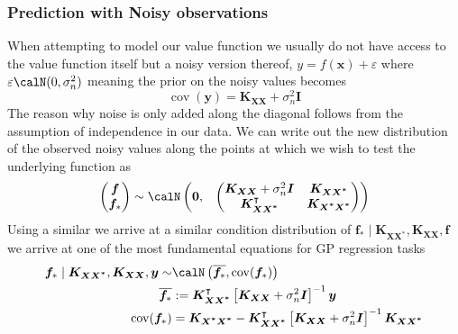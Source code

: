 \subsubsection{Prediction with Noisy observations}\label{Section1.1.2}
When attempting to model our value function we usually do not have access to the value function itself but a noisy version thereof, $y = f(\bm{x}) + \varepsilon$ where $\varepsilon \calN (0, \sigma_n^2)$ meaning the prior on the noisy values becomes
\[
	\operatorname{cov} (\bm{y}) = \bm{K_{XX}} + \sigma_n^2 \bm{I}
\]
The reason why noise is only added along the diagonal follows from the assumption of independence in our data.
We can write out the new distribution of the observed noisy values along the points at which we wish to test the underlying function as
\[
	\begin{pmatrix}
		\bm{f} \\
		\bm{f}_{\ast}
	\end{pmatrix}
	\sim \calN
	\begin{pmatrix}
		\bm{0}, &
		{
				\begin{pmatrix}
					\bm{K_{XX}} + \sigma_n^2 \bm{I} & \bm{K_{XX^{\ast}}}        \\
					\bm{K_{XX^{\ast}}}^{\intercal}  & \bm{K_{X^{\ast}X^{\ast}}}
				\end{pmatrix}
			}
	\end{pmatrix}
\]
Using a similar we arrive at a similar condition distribution of $\bm{f}_{\ast} \mid \bm{K_{XX^{\ast}}} , \bm{K_{XX}}, \bm{f}$ we arrive at one of the most fundamental equations for GP regression tasks
\begin{align*}\label{prop:GP_train_distr2}
	\bm{f}_{\ast} \mid \bm{K_{XX^{\ast}}} , \bm{K_{XX}}, \bm{y} \sim & \calN \left( \overline{\bm{f}_{\ast}}, \operatorname{cov} (\bm{f}_{\ast}) \right)                                                   \\
	\overline{\bm{f}_{\ast}}                                         & := \bm{K_{XX^{\ast}}}^{\intercal} \left[ \bm{K_{XX}} + \sigma_n^2 \bm{I} \right]^{-1} \bm{y}                                        \\
	\operatorname{cov} (\bm{f}_{\ast})                               & = \bm{K_{X^{\ast}X^{\ast}}} - \bm{K_{XX^{\ast}}}^{\intercal} \left[ \bm{K_{XX}} + \sigma_n^2 \bm{I} \right]^{-1} \bm{K_{XX^{\ast}}}
\end{align*}


